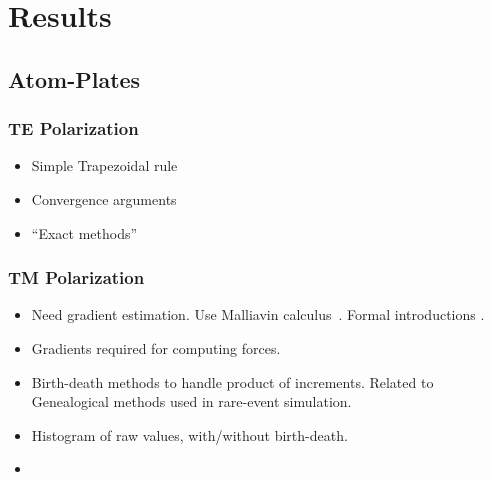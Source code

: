 \section{Results}
    \subsection{Atom-Plates}
    
    \subsubsection{TE Polarization}
    \begin{itemize}
      \item Simple Trapezoidal rule
      \item Convergence arguments
      \item ``Exact methods''
    \end{itemize}
    
    \subsubsection{TM Polarization}

    \begin{itemize}
      \item Need gradient estimation.  Use Malliavin calculus~\cite{Fournie1999, Chen2007,Kohatsu-Higa2003}.
        Formal introductions \cite{Nualart2006, Malliavin2006, DiNunno2009}.
      \item Gradients required for computing forces.  
      \item Birth-death methods to handle product of increments.  Related to Genealogical 
        methods used in rare-event simulation.  
      \item Histogram of raw values, with/without birth-death.
      \item 
    \end{itemize}
    






